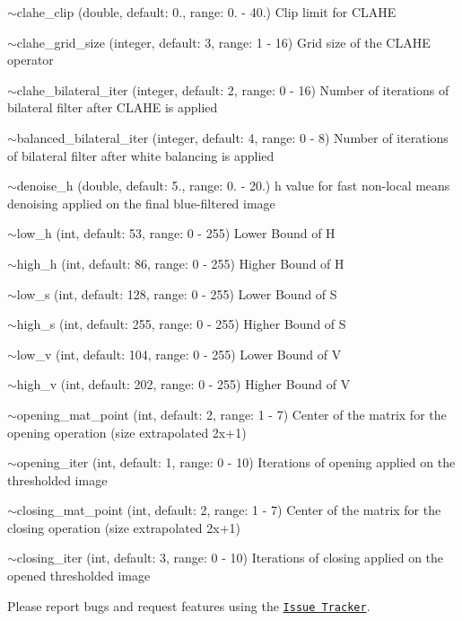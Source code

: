 \begin{DoxyItemize}
\item {\ttfamily $\sim$clahe\+\_\+clip} (double, default\+: 0., range\+: 0. -\/ 40.) Clip limit for C\+L\+A\+HE
\item {\ttfamily $\sim$clahe\+\_\+grid\+\_\+size} (integer, default\+: 3, range\+: 1 -\/ 16) Grid size of the C\+L\+A\+HE operator
\item {\ttfamily $\sim$clahe\+\_\+bilateral\+\_\+iter} (integer, default\+: 2, range\+: 0 -\/ 16) Number of iterations of bilateral filter after C\+L\+A\+HE is applied
\item {\ttfamily $\sim$balanced\+\_\+bilateral\+\_\+iter} (integer, default\+: 4, range\+: 0 -\/ 8) Number of iterations of bilateral filter after white balancing is applied
\item {\ttfamily $\sim$denoise\+\_\+h} (double, default\+: 5., range\+: 0. -\/ 20.) h value for fast non-\/local means denoising applied on the final blue-\/filtered image
\item {\ttfamily $\sim$low\+\_\+h} (int, default\+: 53, range\+: 0 -\/ 255) Lower Bound of H
\item {\ttfamily $\sim$high\+\_\+h} (int, default\+: 86, range\+: 0 -\/ 255) Higher Bound of H
\item {\ttfamily $\sim$low\+\_\+s} (int, default\+: 128, range\+: 0 -\/ 255) Lower Bound of S
\item {\ttfamily $\sim$high\+\_\+s} (int, default\+: 255, range\+: 0 -\/ 255) Higher Bound of S
\item {\ttfamily $\sim$low\+\_\+v} (int, default\+: 104, range\+: 0 -\/ 255) Lower Bound of V
\item {\ttfamily $\sim$high\+\_\+v} (int, default\+: 202, range\+: 0 -\/ 255) Higher Bound of V
\item {\ttfamily $\sim$opening\+\_\+mat\+\_\+point} (int, default\+: 2, range\+: 1 -\/ 7) Center of the matrix for the opening operation (size extrapolated 2x+1)
\item {\ttfamily $\sim$opening\+\_\+iter} (int, default\+: 1, range\+: 0 -\/ 10) Iterations of opening applied on the thresholded image
\item {\ttfamily $\sim$closing\+\_\+mat\+\_\+point} (int, default\+: 2, range\+: 1 -\/ 7) Center of the matrix for the closing operation (size extrapolated 2x+1)
\item {\ttfamily $\sim$closing\+\_\+iter} (int, default\+: 3, range\+: 0 -\/ 10) Iterations of closing applied on the opened thresholded image
\end{DoxyItemize}

Please report bugs and request features using the \href{https://github.com/AUV-IITK/auv2018/issues}{\tt Issue Tracker}. 